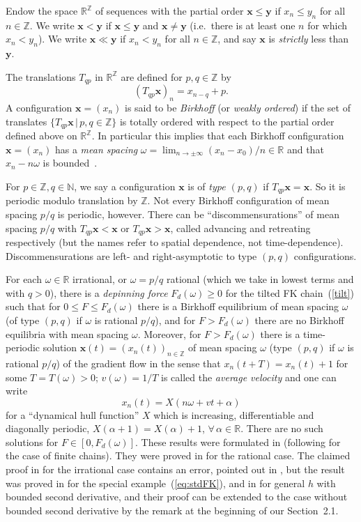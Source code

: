 \documentclass[12pt]{article}
\newcommand{\R}{\mathbb{R}}
\newcommand{\Z}{\mathbb{Z}}
\newcommand{\N}{\mathbb{N}}
\newcommand{\refer}[1]{~(\ref{#1})}
\newcommand{\xbf}{{\mathbf{x}}}
\newcommand{\ybf}{{\mathbf{y}}}
\begin{document}
Endow the space $\R^\Z$ of sequences with the partial order $\xbf \le \ybf$ if $x_n \le y_n$ for all $n \in \Z$.
We write $\xbf < \ybf$ if $\xbf \le \ybf$ and $\xbf \ne \ybf$ (i.e.~there is at least one $n$ for which $x_n < y_n$).
We write $\xbf \ll \ybf$ if $x_n < y_n$ for all $n \in \Z$, and say $\xbf$ is {\em strictly} less than $\ybf$.

The translations $T_{qp}$ in $\R^{\Z}$ are defined for $p,q\in\Z$ by
$$(T_{qp}\xbf)_n=x_{n-q}+p .$$
A configuration $\xbf=(x_n)$ is said to be {\em Birkhoff} (or {\em weakly ordered}) if the set of translates $\{T_{qp}\xbf\,|\,p, q \in \Z\}$ is totally ordered with respect to the partial order defined above on $\R^\Z$.  In particular this implies that each Birkhoff configuration $\xbf=(x_n)$ has a {\em mean spacing} $\omega = \lim_{n\to\pm \infty} (x_n-x_0)/n \in \R$ and that $x_n-n\omega$ is bounded~\cite{BM}.

For $p\in \Z, q \in \N$, we say a configuration $\xbf$ is of {\em type $(p,q)$} if $T_{qp}\xbf=\xbf$. So it is periodic modulo translation by $\Z$.  Not every Birkhoff configuration of mean spacing $p/q$ is periodic, however.  There can be ``discommensurations'' of mean spacing $p/q$ with $T_{qp}\xbf<\xbf$ or $T_{qp}\xbf>\xbf$, called advancing and retreating respectively (but the names refer to spatial dependence, not time-dependence).  Discommensurations are left- and right-asymptotic to type $(p,q)$ configurations.

For each $\omega \in \R$ irrational, or $\omega=p/q$ rational (which we take in lowest terms and with $q>0$), there is a {\em depinning force} $F_d(\omega) \ge 0$  for the tilted FK chain\refer{tilt} such that for $0\le F \le F_d(\omega)$ there is a Birkhoff equilibrium of mean spacing $\omega$ (of type $(p,q)$ if $\omega$ is rational $p/q$), and for $F>F_d(\omega)$ there are no Birkhoff equilibria with mean spacing $\omega$.  Moreover, for $F>F_d(\omega)$ there is a time-periodic solution $\xbf(t)=(x_n(t))_{n\in\Z}$ of mean spacing $\omega$ (type $(p,q)$ if $\omega$ is rational $p/q$) of the gradient flow in the sense that $x_n(t+T) = x_n(t)+1$ for some $T=T(\omega)>0$;
 $v(\omega)=1/T$ is called the {\em average velocity}
and one can write
$$x_n(t) = X(n\omega+vt+\alpha)$$
for a ``dynamical hull function'' $X$ which is increasing, differentiable and diagonally periodic, $X(\alpha+1)=X(\alpha)+1$, $\forall\,\alpha\in\R$.
There are no such solutions for $F\in [0,F_d(\omega)]$.
These results were formulated in \cite{FM} (following \cite{Mi} for the case of finite chains).  They were proved in \cite{BM} for the rational case.  The claimed proof in \cite{BM} for the irrational case contains an error, pointed out in \cite{BM2}, but the result was proved in \cite{Q} for the special example\refer{eq:stdFK}, and in \cite{QW1} for general $h$ with bounded second derivative, and their proof can be extended to the case without bounded second derivative by the remark at the beginning of our Section~2.1.
\end{document}
